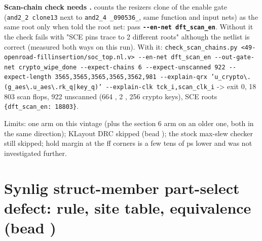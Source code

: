 \begin{record}
\textbf{Scan-chain check needs .}
 counts the
resizer\textquotesingle s clone of the enable gate
(\texttt{and2\_\allowbreak{}2\ clone13} next to
\texttt{and2\_\allowbreak{}4\ \_\allowbreak{}090536\_\allowbreak{}},
same function and input nets) as the same root only when told the root
net: pass
\textbf{\texttt{-\allowbreak{}-\allowbreak{}en-\allowbreak{}net\ dft\_\allowbreak{}scan\_\allowbreak{}en}}.
Without it the check fails with "SCE pins trace to 2 different roots"
although the netlist is correct (measured both ways on this run). With
it:
\texttt{check\_\allowbreak{}scan\_\allowbreak{}chains.\allowbreak{}py\ <49-\allowbreak{}openroad-\allowbreak{}fillinsertion/\allowbreak{}soc\_\allowbreak{}top.\allowbreak{}nl.\allowbreak{}v>\ -\allowbreak{}-\allowbreak{}en-\allowbreak{}net\ dft\_\allowbreak{}scan\_\allowbreak{}en\ -\allowbreak{}-\allowbreak{}out-\allowbreak{}gate-\allowbreak{}net\ crypto\_\allowbreak{}wipe\_\allowbreak{}done\ -\allowbreak{}-\allowbreak{}expect-\allowbreak{}chains\ 6\ -\allowbreak{}-\allowbreak{}expect-\allowbreak{}unscanned\ 922\ -\allowbreak{}-\allowbreak{}expect-\allowbreak{}length\ 3565,\allowbreak{}3565,\allowbreak{}3565,\allowbreak{}3565,\allowbreak{}3562,\allowbreak{}981\ -\allowbreak{}-\allowbreak{}explain-\allowbreak{}qrx\ 'u\_\allowbreak{}crypto\textbackslash{}.\allowbreak{}(g\_\allowbreak{}aes\textbackslash{}.\allowbreak{}u\_\allowbreak{}aes\textbackslash{}.\allowbreak{}rk\_\allowbreak{}q|key\_\allowbreak{}q)'\ -\allowbreak{}-\allowbreak{}explain-\allowbreak{}clk\ tck\_\allowbreak{}i,\allowbreak{}scan\_\allowbreak{}clk\_\allowbreak{}i}
-\textgreater{} exit 0, 18 803 scan flops, 922 unscanned (664
, 2 , 256 crypto keys), SCE roots
\texttt{\{dft\_\allowbreak{}scan\_\allowbreak{}en:\allowbreak{}\ 18803\}}.

Limits: one arm on this vintage (plus the section 6 arm on an older one,
both in the same direction); KLayout DRC skipped (bead ); the
stock max-slew checker still skipped; hold margin at the ff corners is a
few tens of ps lower and was not investigated further.

\end{record}

\section{\texorpdfstring{Synlig struct-member part-select defect: rule,
site table, equivalence (bead
)}{Synlig struct-member part-select defect: rule, site table, equivalence (bead )}}\label{cr:defect:synlig-struct-select-ainf}

